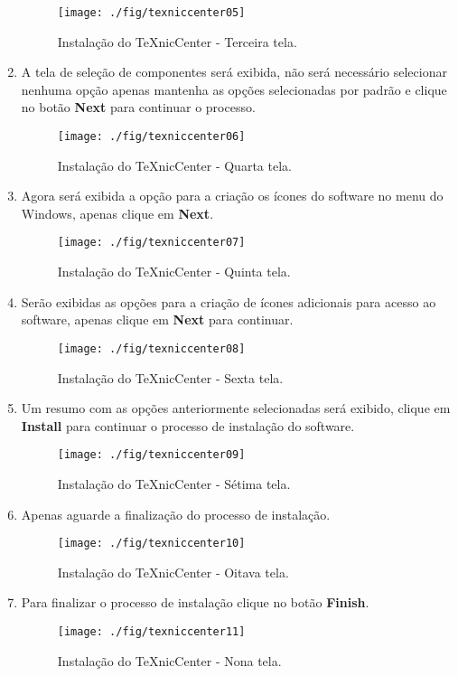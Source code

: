 \begin{enumerate}
\begin{figure}[H]
  \texttt{[image: ./fig/texniccenter05]}
  \caption{Instalação do TeXnicCenter - Terceira tela.}
\end{figure}
\item A tela de seleção de componentes será exibida, não será necessário selecionar nenhuma opção apenas mantenha as opções selecionadas por padrão e clique no botão \textbf{Next} para continuar o processo.
\begin{figure}[H]
  \centering
  \texttt{[image: ./fig/texniccenter06]}
  \caption{Instalação do TeXnicCenter - Quarta tela.}
\end{figure}
\item Agora será exibida a opção para a criação os ícones do software no menu do Windows, apenas clique em \textbf{Next}.
\begin{figure}[H]
  \centering
  \texttt{[image: ./fig/texniccenter07]}
  \caption{Instalação do TeXnicCenter - Quinta tela.}
\end{figure}
\item Serão exibidas as opções para a criação de ícones adicionais para acesso ao software, apenas clique em \textbf{Next} para continuar.
\begin{figure}[H]
  \centering
  \texttt{[image: ./fig/texniccenter08]}
  \caption{Instalação do TeXnicCenter - Sexta tela.}
\end{figure}
\item Um resumo com as opções anteriormente selecionadas será exibido, clique em \textbf{Install} para continuar o processo de instalação do software.
\begin{figure}[H]
  \centering
  \texttt{[image: ./fig/texniccenter09]}
  \caption{Instalação do TeXnicCenter - Sétima tela.}
\end{figure}
\item Apenas aguarde a finalização do processo de instalação.
\begin{figure}[H]
  \centering
  \texttt{[image: ./fig/texniccenter10]}
  \caption{Instalação do TeXnicCenter - Oitava tela.}
\end{figure}
\item Para finalizar o processo de instalação clique no botão \textbf{Finish}.
\begin{figure}[H]
  \centering
  \texttt{[image: ./fig/texniccenter11]}
  \caption{Instalação do TeXnicCenter - Nona tela.}
\end{figure}
\end{enumerate}

